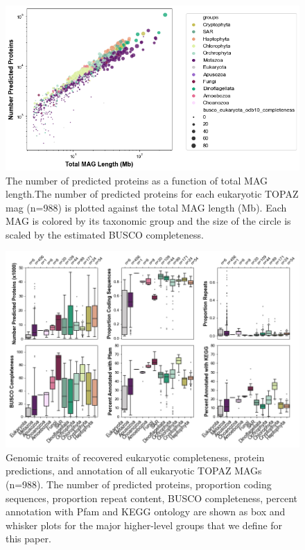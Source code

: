 \documentclass[12pt]{article}
\numberwithin{equation}{section}
\begin{document}
\begin{figure}
    \centering
    \includegraphics[width=0.95\columnwidth]{si-figures/ALL_MAGS_Num-Prot-Leng.png}
    \caption{The number of predicted proteins as a function of total MAG length.The number of predicted proteins for each eukaryotic TOPAZ mag (n=988) is plotted against the total MAG length (Mb). Each MAG is colored by its taxonomic group and the size of the circle is scaled by the estimated BUSCO completeness.}
    \label{fig:all-prot-len}
\end{figure}

\begin{landscape}
\begin{figure}
    \centering
    \includegraphics[width=0.9\columnwidth]{si-figures/ALL_MAG_protein_bar_plots.png}
    \caption{Genomic traits of recovered eukaryotic completeness, protein predictions, and annotation of all eukaryotic TOPAZ MAGs (n=988). The number of predicted proteins, proportion coding sequences, proportion repeat content, BUSCO completeness, percent annotation with Pfam and KEGG ontology are shown as box and whisker plots for the major higher-level groups that we define for this paper.}
    \label{fig:all-prot-bar}
\end{figure}
\end{landscape}
\end{document}
